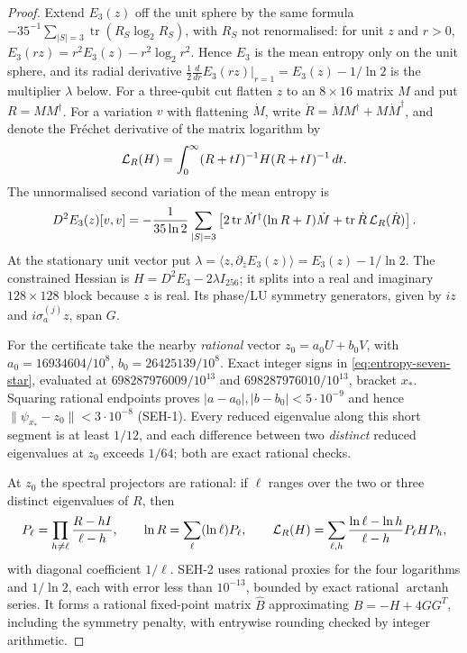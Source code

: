 \begin{proof}
Extend \(E_3(z)\) off the unit sphere by the same formula
\(-35^{-1}\sum_{|S|=3}\operatorname{tr}(R_S\log_2 R_S)\), with \(R_S\) not renormalised:
for unit \(z\) and \(r>0\), \(E_3(rz)=r^2E_3(z)-r^2\log_2r^2\). Hence \(E_3\) is the mean entropy only on the
unit sphere, and its radial derivative \(\frac12\frac{d}{dr}E_3(rz)|_{r=1}=E_3(z)-1/\ln2\) is the multiplier \(\lambda\) below.
For a three-qubit cut flatten \(z\) to an \(8\times16\) matrix \(M\)
and put \(R=MM^\dagger\). For a variation \(v\) with flattening \(\dot M\),
write \(\dot R=\dot MM^\dagger+M\dot M^\dagger\), and denote the Fréchet
derivative of the matrix logarithm by
\[
 {\cal L}_R(H)=\int_0^\infty(R+tI)^{-1}H(R+tI)^{-1}\,dt.
\]
The unnormalised second variation of the mean entropy is
\begin{equation}\label{eq:entropy-seven-H-form}
 D^2 E_3(z)[v,v]
 =-\frac1{35\ln2}\sum_{|S|=3}
 \left[2\operatorname{tr}\dot M^\dagger(\ln R+I)\dot M
 +\operatorname{tr}\dot R\,{\cal L}_R(\dot R)\right].
\end{equation}
At the stationary unit vector put
\(\lambda=\langle z,\partial_{\bar z} E_3(z)\rangle
=E_3(z)-1/\ln2\).
The constrained Hessian is \(H=D^2E_3-2\lambda I_{256}\);
it splits into a real and imaginary \(128\times128\) block
because \(z\) is real. Its phase/LU symmetry generators, given
by \(iz\) and \(i\sigma_a^{(j)}z\), span \(G\).

For the certificate take the nearby \emph{rational} vector
\(z_0=a_0U+b_0V\), with \(a_0=16934604/10^8\),
\(b_0=26425139/10^8\). Exact integer signs in
\eqref{eq:entropy-seven-star}, evaluated at
\(698287976009/10^{13}\) and \(698287976010/10^{13}\), bracket
\(x_*\). Squaring rational endpoints proves
\(|a-a_0|,|b-b_0|<5\cdot10^{-9}\) and hence
\(\|\psi_{x_*}-z_0\|<3\cdot10^{-8}\) (SEH-1).
Every reduced eigenvalue along this short segment is at least
\(1/12\), and each difference between two \emph{distinct}
reduced eigenvalues at \(z_0\) exceeds \(1/64\); both are
exact rational checks.

At \(z_0\) the spectral projectors are rational: if \(\ell\)
ranges over the two or three distinct eigenvalues of \(R\), then
\[
 P_\ell=\prod_{h\ne\ell}\frac{R-hI}{\ell-h},\qquad
 \ln R=\sum_\ell(\ln\ell)P_\ell,\qquad
 {\cal L}_R(H)=\sum_{\ell,h}
 \frac{\ln\ell-\ln h}{\ell-h}P_\ell H P_h,
\]
with diagonal coefficient \(1/\ell\). SEH-2 uses rational proxies
for the four logarithms and \(1/\ln2\), each with error less than
\(10^{-13}\), bounded by exact rational \(\operatorname{arctanh}\)
series. It forms a rational fixed-point matrix \(\widehat B\)
approximating \(B=-H+4GG^T\), including the symmetry penalty,
with entrywise rounding checked by integer arithmetic.


\end{proof}
